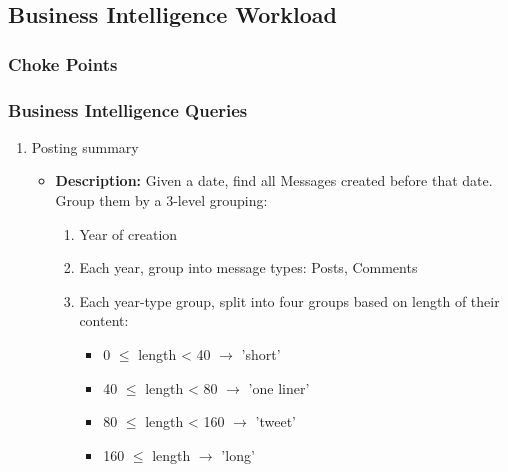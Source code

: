 
\subsection{Business Intelligence Workload}
\subsubsection{Choke Points}

\subsubsection{Business Intelligence Queries}

{\small
    \begin{enumerate}
      \item Posting summary 
            \begin{itemize}
                \item \textbf{Description:}
                  Given a date, find all Messages created before that date. \\
                  Group them by a 3-level grouping: \\

                  \begin{enumerate}
                    \item Year of creation
                    \item Each year, group into message types: Posts, Comments
                    \item Each year-type group, split into four groups based on length of their content:
                          \begin{itemize}
                            \item 0 $\le$ length < 40 $\rightarrow$ 'short' 
                            \item 40 $\le$ length < 80 $\rightarrow$ 'one liner' 
                            \item 80 $\le$ length < 160 $\rightarrow$ 'tweet' 
                            \item 160 $\le$ length $\rightarrow$ 'long' 
                          \end{itemize}
                  \end{enumerate}


\end{itemize}
\end{enumerate}}
